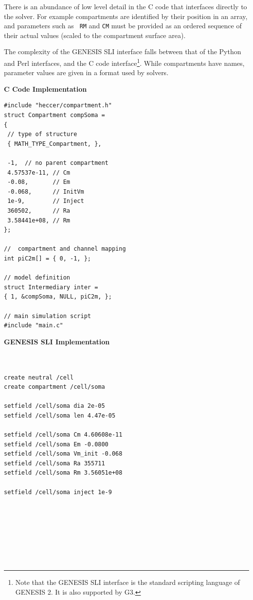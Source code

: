\documentclass[12pt]{article}
\begin{document}
There is an abundance of low level detail in the C code that
interfaces directly to the solver.  For example compartments are
identified by their position in an array, and parameters such as {\tt
  RM} and {\tt CM} must be provided as an ordered sequence of their
actual values (scaled to the compartment surface area).

The complexity of the GENESIS SLI interface falls between that of the
Python and Perl interfaces, and the C code interface\footnote{Note
  that the GENESIS SLI interface is the standard scripting language of
  GENESIS 2. It is also supported by G3.}.  While compartments have
names, parameter values are given in a format used by solvers.

{\vspace*{1mm} \footnotesize
  \begin{minipage}{1\linewidth}
    
    \begin{minipage}[t]{.50\linewidth}
{\bf C Code Implementation}
\resetlinenumber
\begin{verbatim}
#include "heccer/compartment.h"
struct Compartment compSoma =
{
 // type of structure
 { MATH_TYPE_Compartment, },

 -1,  // no parent compartment
 4.57537e-11, // Cm
 -0.08,       // Em
 -0.068,      // InitVm
 1e-9,        // Inject
 360502,      // Ra
 3.58441e+08, // Rm
};

//  compartment and channel mapping
int piC2m[] = { 0, -1, };

// model definition
struct Intermediary inter =
{ 1, &compSoma, NULL, piC2m, };

// main simulation script
#include "main.c"

\end{verbatim}
    \end{minipage}
    \begin{minipage}[t]{.50\linewidth}
{\bf GENESIS SLI Implementation}
\resetlinenumber
\begin{verbatim}


create neutral /cell
create compartment /cell/soma

setfield /cell/soma dia 2e-05
setfield /cell/soma len 4.47e-05

setfield /cell/soma Cm 4.60608e-11
setfield /cell/soma Em -0.0800
setfield /cell/soma Vm_init -0.068
setfield /cell/soma Ra 355711
setfield /cell/soma Rm 3.56051e+08

setfield /cell/soma inject 1e-9








\end{verbatim}
\end{minipage}
\end{minipage}}
\end{document}
